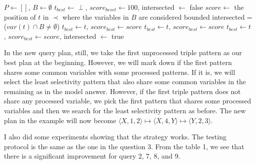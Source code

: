 \documentclass{article}
\begin{document}
\begin{enumerate}
\begin{enumerate}
\begin{algorithm}[H]
\begin{algorithmic}
\State $P \leftarrow []$, $B\leftarrow \emptyset$
\State $t_{best}\leftarrow \perp$, $score_{beset} \leftarrow 100$, intersected $\leftarrow$ false
\State $score \leftarrow$ the position of $t$ in $\prec$ where the variables in $B$ are considered bounded
\State intersected = ($var(t) \cap B \neq \emptyset$)
\State $t_{best} \leftarrow t$, $score_{best} \leftarrow score$
\State $t_{best} \leftarrow t$, $score_{best} \leftarrow score$
\EndIf
\Else
{} 
\State $t_{best} \leftarrow t$, $score_{best} \leftarrow score$, intersected $\leftarrow$ true
\EndIf
\EndIf

\EndFor
\EndWhile

\end{algorithmic}
\end{algorithm}

In the new query plan, still, we take the first unprocessed triple pattern as our best plan at the beginning. However, we will mark down if the first pattern shares some common variables with some processed patterns. If it is, we will select the least selectivity pattern that also share some common variables in the remaining as in the model answer. However, if the first triple pattern does not share any processed variable, we pick the first pattern that shares some processed variables and then we search for the least selectivity pattern as before. The new plan in the example will now become $\langle X, 1, 2\rangle \mapsto \langle X, 4, Y\rangle \mapsto \langle Y, 2, 3\rangle$. 

I also did some experiments showing that the strategy works. The testing protocol is the same as the one in the question 3. From the table 1, we see that there is a significant improvement for query 2, 7, 8, and 9. 


\end{enumerate}
\end{enumerate}
\end{document}
